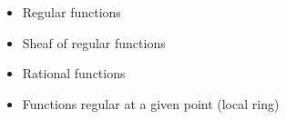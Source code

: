 

\begin{itemize}
	\item Regular functions
	\item Sheaf of regular functions
	\item Rational functions
	\item Functions regular at a given point (local ring)
\end{itemize}


